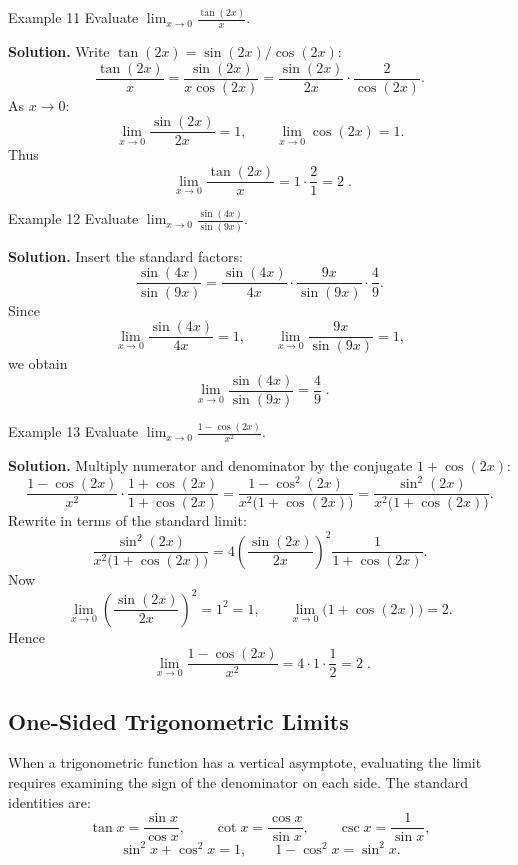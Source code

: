 \begin{examplebox}{Example 11}
Evaluate \(\displaystyle \lim_{x \to 0} \frac{\tan(2x)}{x}\).

\medskip
\textbf{Solution.}
Write \(\tan(2x) = \sin(2x)/\cos(2x)\):
\[
\frac{\tan(2x)}{x}
= \frac{\sin(2x)}{x\cos(2x)}
= \frac{\sin(2x)}{2x} \cdot \frac{2}{\cos(2x)}.
\]
As \(x \to 0\):
\[
\lim_{x \to 0} \frac{\sin(2x)}{2x} = 1,
\qquad
\lim_{x \to 0} \cos(2x) = 1.
\]
Thus
\[
\boxed{\;\lim_{x \to 0} \frac{\tan(2x)}{x} = 1 \cdot \frac{2}{1} = 2\;}.
\]
\end{examplebox}

\begin{examplebox}{Example 12}
Evaluate \(\displaystyle \lim_{x \to 0} \frac{\sin(4x)}{\sin(9x)}\).

\medskip
\textbf{Solution.}
Insert the standard factors:
\[
\frac{\sin(4x)}{\sin(9x)}
= \frac{\sin(4x)}{4x} \cdot \frac{9x}{\sin(9x)} \cdot \frac{4}{9}.
\]
Since
\[
\lim_{x \to 0} \frac{\sin(4x)}{4x} = 1,
\qquad
\lim_{x \to 0} \frac{9x}{\sin(9x)} = 1,
\]
we obtain
\[
\boxed{\;\lim_{x \to 0} \frac{\sin(4x)}{\sin(9x)} = \frac{4}{9}\;}.
\]
\end{examplebox}

\begin{examplebox}{Example 13}
Evaluate \(\displaystyle \lim_{x \to 0} \frac{1 - \cos(2x)}{x^{2}}\).

\medskip
\textbf{Solution.}
Multiply numerator and denominator by the conjugate \(1 + \cos(2x)\):
\[
\frac{1 - \cos(2x)}{x^{2}}
\cdot
\frac{1 + \cos(2x)}{1 + \cos(2x)}
= \frac{1 - \cos^{2}(2x)}{x^{2}\bigl(1 + \cos(2x)\bigr)}
= \frac{\sin^{2}(2x)}{x^{2}\bigl(1 + \cos(2x)\bigr)}.
\]
Rewrite in terms of the standard limit:
\[
\frac{\sin^{2}(2x)}{x^{2}\bigl(1 + \cos(2x)\bigr)}
= 4\left(\frac{\sin(2x)}{2x}\right)^{\!2}
\frac{1}{1 + \cos(2x)}.
\]
Now
\[
\lim_{x \to 0} \left(\frac{\sin(2x)}{2x}\right)^{\!2} = 1^{2} = 1,
\qquad
\lim_{x \to 0} \bigl(1 + \cos(2x)\bigr) = 2.
\]
Hence
\[
\boxed{\;\lim_{x \to 0} \frac{1 - \cos(2x)}{x^{2}} = 4 \cdot 1 \cdot \frac{1}{2} = 2\;}.
\]
\end{examplebox}

\subsection*{One-Sided Trigonometric Limits}
\label{subsec:1.6.3}

When a trigonometric function has a vertical asymptote, evaluating the limit requires examining the sign of the denominator on each side. The standard identities are:
\[
\tan x = \frac{\sin x}{\cos x},\qquad
\cot x = \frac{\cos x}{\sin x},\qquad
\csc x = \frac{1}{\sin x},
\]
\[
\sin^{2}x + \cos^{2}x = 1,\qquad
1 - \cos^{2}x = \sin^{2}x.
\]

